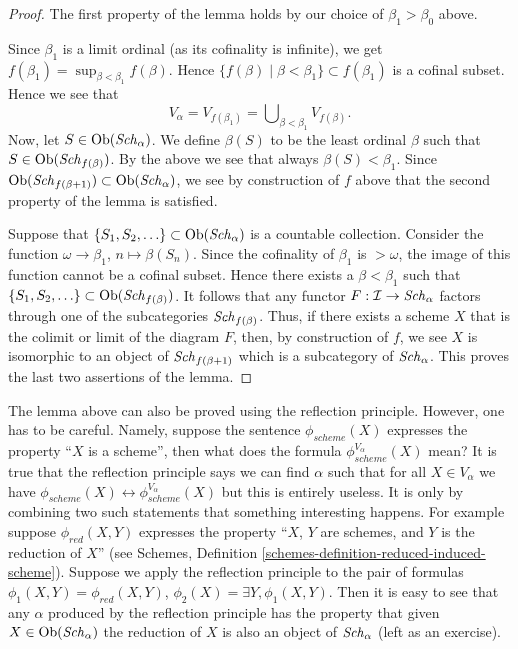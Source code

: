 \begin{proof}
\medskip\noindent
The first property of the lemma holds by our choice
of $\beta_1 > \beta_0$ above.

\medskip\noindent
Since $\beta_1$ is a limit ordinal (as its cofinality is infinite),
we get $f(\beta_1) = \sup_{\beta < \beta_1} f(\beta)$.
Hence $\{f(\beta) \mid \beta < \beta_1\} \subset f(\beta_1)$ is a
cofinal subset. Hence we see that
$$
V_\alpha = V_{f(\beta_1)} = \bigcup\nolimits_{\beta < \beta_1} V_{f(\beta)}.
$$
Now, let $S \in \mathop{\mathrm{Ob}}\nolimits(\mathit{Sch}_\alpha)$. We define
$\beta(S)$ to be the least ordinal $\beta$ such that
$S \in \mathop{\mathrm{Ob}}\nolimits(\mathit{Sch}_{f(\beta)})$. By the above we see
that always $\beta(S) < \beta_1$. Since
$\mathop{\mathrm{Ob}}\nolimits(\mathit{Sch}_{f(\beta + 1)}) \subset
\mathop{\mathrm{Ob}}\nolimits(\mathit{Sch}_\alpha)$, we
see by construction of $f$ above that the second property of the lemma
is satisfied.

\medskip\noindent
Suppose that $\{S_1, S_2, \ldots\} \subset \mathop{\mathrm{Ob}}\nolimits(\mathit{Sch}_\alpha)$
is a countable collection. Consider the function
$\omega \to \beta_1$, $n \mapsto \beta(S_n)$. Since the cofinality
of $\beta_1$ is $> \omega$, the image of this function cannot be a
cofinal subset. Hence there exists a $\beta < \beta_1$ such
that $\{S_1, S_2, \ldots\} \subset \mathop{\mathrm{Ob}}\nolimits(\mathit{Sch}_{f(\beta)})$.
It follows that any functor $F : \mathcal{I} \to \mathit{Sch}_\alpha$
factors through one of the subcategories $\mathit{Sch}_{f(\beta)}$.
Thus, if there exists a scheme $X$ that is the colimit or limit
of the diagram $F$, then, by construction of $f$, we see
$X$ is isomorphic to an object
of $\mathit{Sch}_{f(\beta + 1)}$ which is a subcategory of
$\mathit{Sch}_\alpha$. This proves the last two assertions of
the lemma.
\end{proof}

\begin{remark}
\label{remark-how-to-use-reflection}
The lemma above can also be proved using the reflection principle.
However, one has to be careful. Namely, suppose the sentence
$\phi_{scheme}(X)$ expresses the property ``$X$ is a scheme'', then
what does the formula $\phi_{scheme}^{V_\alpha}(X)$ mean?
It is true that the reflection principle says we can find $\alpha$ such that
for all $X \in V_\alpha$ we have
$\phi_{scheme}(X) \leftrightarrow \phi_{scheme}^{V_\alpha}(X)$
but this is entirely useless. It is only by combining two such
statements that something interesting happens. For example suppose
$\phi_{red}(X, Y)$ expresses the property ``$X$, $Y$ are schemes,
and $Y$ is the reduction of $X$'' (see
Schemes, Definition \ref{schemes-definition-reduced-induced-scheme}).
Suppose we apply the reflection principle to the pair of
formulas $\phi_1(X, Y) = \phi_{red}(X, Y)$,
$\phi_2(X) = \exists Y, \phi_1(X, Y)$. Then it is easy to see that
any $\alpha$ produced by the reflection principle has the property that
given $X \in \mathop{\mathrm{Ob}}\nolimits(\mathit{Sch}_\alpha)$ the reduction of
$X$ is also an object of $\mathit{Sch}_\alpha$ (left as an exercise).
\end{remark}

